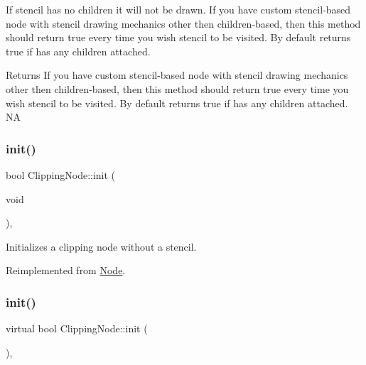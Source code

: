 If stencil has no children it will not be drawn. If you have custom stencil-\/based node with stencil drawing mechanics other then children-\/based, then this method should return true every time you wish stencil to be visited. By default returns true if has any children attached.

\begin{DoxyReturn}{Returns}
If you have custom stencil-\/based node with stencil drawing mechanics other then children-\/based, then this method should return true every time you wish stencil to be visited. By default returns true if has any children attached.  NA 
\end{DoxyReturn}
\mbox{\label{classClippingNode_a37848375cd3458d93c9ef182fd78219a}} 
\subsubsection{\texorpdfstring{init()}{init()}\hspace{0.1cm}{\footnotesize\ttfamily [1/4]}}
{\footnotesize\ttfamily bool Clipping\+Node\+::init (\begin{DoxyParamCaption}\item[{void}]{ }\end{DoxyParamCaption})\hspace{0.3cm}{\ttfamily [override]}, {\ttfamily [virtual]}}

Initializes a clipping node without a stencil. 

Reimplemented from \hyperlink{classNode}{Node}.

\mbox{\label{classClippingNode_aa71373ded3aa4177bad3f706a0570c2d}} 
\subsubsection{\texorpdfstring{init()}{init()}\hspace{0.1cm}{\footnotesize\ttfamily [2/4]}}
{\footnotesize\ttfamily virtual bool Clipping\+Node\+::init (\begin{DoxyParamCaption}{ }\end{DoxyParamCaption})\hspace{0.3cm}{\ttfamily [override]}, {\ttfamily [virtual]}}

